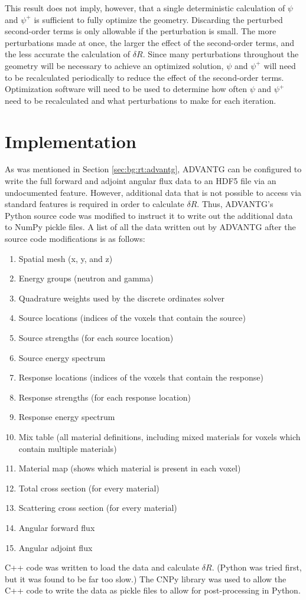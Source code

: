 This result does not imply, however, that a single deterministic calculation of $\psi$ and $\psi^+$ is sufficient to fully optimize the geometry.
Discarding the perturbed second-order terms is only allowable if the perturbation is small.
The more perturbations made at once, the larger the effect of the second-order terms, and the less accurate the calculation of $\delta R$.
Since many perturbations throughout the geometry will be necessary to achieve an optimized solution, $\psi$ and $\psi^+$ will need to be recalculated periodically to reduce the effect of the second-order terms.
Optimization software will need to be used to determine how often $\psi$ and $\psi^+$ need to be recalculated and what perturbations to make for each iteration.

\section{Implementation}
\label{sec:dr:implementation}

As was mentioned in Section \ref{sec:bg:rt:advantg}, ADVANTG can be configured to write the full forward and adjoint angular flux data to an HDF5 file via an undocumented feature.
However, additional data that is not possible to access via standard features is required in order to calculate $\delta R$.
Thus, ADVANTG's Python source code was modified to instruct it to write out the additional data to NumPy \cite{numpy} pickle files.
A list of all the data written out by ADVANTG after the source code modifications is as follows:

\begin{enumerate}
  \item Spatial mesh (x, y, and z)
  \item Energy groups (neutron and gamma)
  \item Quadrature weights used by the discrete ordinates solver
  \item Source locations (indices of the voxels that contain the source)
  \item Source strengths (for each source location)
  \item Source energy spectrum
  \item Response locations (indices of the voxels that contain the response)
  \item Response strengths (for each response location)
  \item Response energy spectrum
  \item Mix table (all material definitions, including mixed materials for voxels which contain multiple materials)
  \item Material map (shows which material is present in each voxel)
  \item Total cross section (for every material)
  \item Scattering cross section (for every material)
  \item Angular forward flux
  \item Angular adjoint flux
\end{enumerate}

C++ code was written to load the data and calculate $\delta R$.
(Python was tried first, but it was found to be far too slow.)
The CNPy \cite{cnpy} library was used to allow the C++ code to write the data as pickle files to allow for post-processing in Python.
